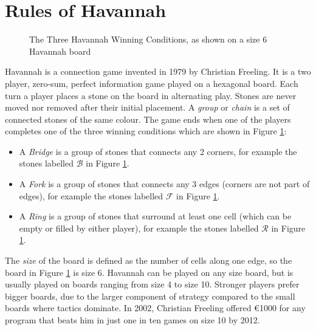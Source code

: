 
\section{Rules of Havannah}


\begin{figure}
\centering
\begin{HavannahBoard}[board size=6,coordinate style=classical]
\end{HavannahBoard}
\caption[The Three Havannah Winning Conditions]{The Three Havannah Winning Conditions, as shown on a size 6 Havannah board}
\label{fig:rules}
\end{figure}

Havannah is a connection game invented in 1979 by Christian Freeling. It is a two player, zero-sum, perfect information game played on a hexagonal board. Each turn a player places a stone on the board in alternating play. Stones are never moved nor removed after their initial placement. A \textit{group} or \textit{chain} is a set of connected stones of the same colour. The game ends when one of the players completes one of the three winning conditions which are shown in Figure \ref{fig:rules}:
\begin{itemize}
	\setlength{\itemsep}{0pt}
	\setlength{\parskip}{0pt}
	\setlength{\parsep}{0pt}
	\item A \textit{Bridge} is a group of stones that connects any 2 corners, for example the stones labelled $\mathcal B$ in Figure \ref{fig:rules}.
	\item A \textit{Fork} is a group of stones that connects any 3 edges (corners are not part of edges), for example the stones labelled $\mathcal F$ in Figure \ref{fig:rules}.
	\item A \textit{Ring} is a group of stones that surround at least one cell (which can be empty or filled by either player), for example the stones labelled $\mathcal R$ in Figure \ref{fig:rules}.
\end{itemize}

The \textit{size} of the board is defined as the number of cells along one edge, so the board in Figure \ref{fig:rules} is size 6. Havannah can be played on any size board, but is usually played on boards ranging from size 4 to size 10. Stronger players prefer bigger boards, due to the larger component of strategy compared to the small boards where tactics dominate. In 2002, Christian Freeling offered \euro 1000 for any program that beats him in just one in ten games on size 10 by 2012.

